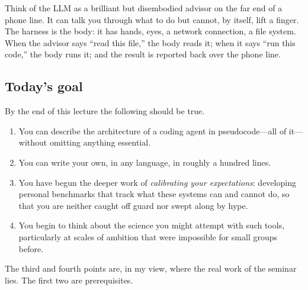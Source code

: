 \begin{intuition}
  Think of the LLM as a brilliant but disembodied advisor on the
  far end of a phone line.  It can talk you through what to do
  but cannot, by itself, lift a finger.  The harness is the body:
  it has hands, eyes, a network connection, a file system.  When
  the advisor says ``read this file,'' the body reads it; when it
  says ``run this code,'' the body runs it; and the result is
  reported back over the phone line.
\end{intuition}

\subsection{Today's goal}

By the end of this lecture the following should be true.

\begin{enumerate}[(1)]
  \item You can describe the architecture of a coding agent
    in pseudocode---all of it---without omitting anything
    essential.
  \item You can write your own, in any language, in roughly
    a hundred lines.
  \item You have begun the deeper work of \emph{calibrating
    your expectations}: developing personal benchmarks that
    track what these systems can and cannot do, so that you
    are neither caught off guard nor swept along by hype.
  \item You begin to think about the science you might
    attempt with such tools, particularly at scales of
    ambition that were impossible for small groups before.
\end{enumerate}

\noindent The third and fourth points are, in my view, where
the real work of the seminar lies.  The first two are
prerequisites.
